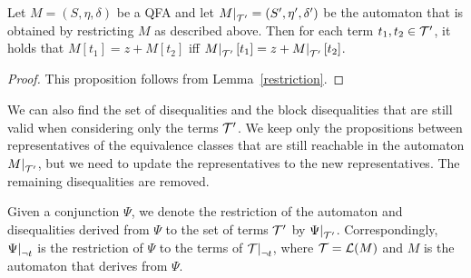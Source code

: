 \begin{proposition}
    Let $M = (S, \eta, \delta)$ be a QFA and let $\restr{M}{\T'} = (S', \eta', \delta')$ be the automaton that is obtained by restricting $M$ as described above.
    Then for each term $t_1, t_2 \in \mathcal{T}'$, it holds that $M[t_1] = z + M[t_2]$ iff $\restr{M}{\T'}[t_1] = z + \restr{M}{\T'}[t_2]$.
\end{proposition}
\begin{proof}
    This proposition follows from Lemma~\ref{restriction}.
\end{proof}

We can also find the set of disequalities and the block disequalities that are still valid when considering only the terms $\mathcal{T}'$.
We keep only the propositions between representatives of the equivalence classes that are still reachable in the automaton $\restr{M}{\T'}$, but we need to update the representatives to the new representatives.
The remaining disequalities are removed.

Given a conjunction $\Psi$, we denote the restriction of the automaton and disequalities derived from $\Psi$ to the set of terms $\mathcal{T}'$ by $\restr{\Psi}{\T'}$.
Correspondingly, $\restr{\Psi}{\neg t}$ is the restriction of $\Psi$ to the terms of $\restr{\T}{\neg t}$, where $\mathcal{T} = \mathcal{L}(M)$ and $M$ is the automaton that derives from $\Psi$.
